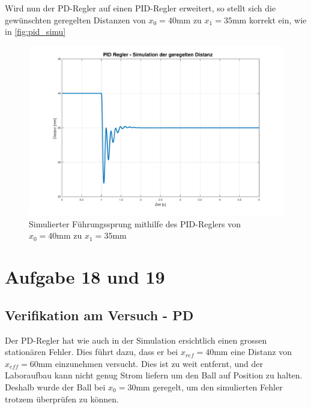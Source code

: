			Wird nun der PD-Regler auf einen PID-Regler erweitert, so stellt sich die gewünschten geregelten Distanzen von   $x_0 = 40\si{\milli\meter}$ zu $x_1 = 35\si{\milli\meter} $ korrekt ein, wie in \autoref{fig:pid_simu}	
			\begin{figure}[H]
				\centering
				\includegraphics[width=\textwidth]{./figure/PID_simu.pdf}
				\caption{Simulierter Führungssprung mithilfe des PID-Reglers von $x_0 = 40\si{\milli\meter}$ zu $x_1 = 35\si{\milli\meter}$}
				\label{fig:pid_simu}
			\end{figure}
\newpage

\section{Aufgabe 18 und 19}\label{sec:Aufgabe1819}
	\subsection*{Verifikation am Versuch - PD}

	Der PD-Regler hat wie auch in der Simulation ersichtlich einen grossen stationären Fehler. Dies führt dazu, dass er bei $x_{ref}=40\si{\milli\meter}$ eine Distanz von $x_{eff}=60\si{\milli\meter}$ einzunehmen versucht. Dies ist zu weit entfernt, und der Laboraufbau kann nicht genug Strom liefern um den Ball auf Position zu halten. Deshalb wurde der Ball bei $x_0 = 30\si{\milli\meter}$ geregelt, um den simulierten Fehler trotzem überprüfen zu können.
			

